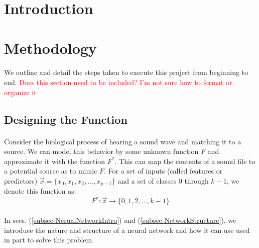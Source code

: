 \documentclass[12pt,letterpaper]{article}
\begin{document}
\section{Introduction}
\label{sec-Introduction}


\newpage
\section{Methodology}
\label{sec-Methodology}

\paragraph*{}We outline and detail the steps taken to execute this project from beginning to end.
\textcolor{red}{Does this section need to be included? I'm not sure how to format or organize it}


\subsection{Designing the Function}

\paragraph*{}Consider the biological process of hearing a sound wave and matching it to a source. We can model this behavior by some unknown function $F$ and approximate it with the function $F^*$. This can map the contents of a sound file to a potential source as to mimic $F$. For a set of inputs (called features or predictors) $\vec{x} = \big\{ x_0 , x_1 , x_2 , ... , x_{p-1} \big\}$ and a set of classes $0$ through $k-1$, we denote this function as:
\begin{equation}
\label{eqn-MappingFunction}
F^*: \vec{x} \rightarrow \big\{ 0 , 1 , 2 , ... , k-1 \big\}
\end{equation}

\paragraph*{}In secs. (\ref{subsec-NerualNetworkIntro}) and (\ref{subsec-NetworkStructure}), we introduce the nature and structure of a neural network and how it can use used in part to solve this problem.
\end{document}
